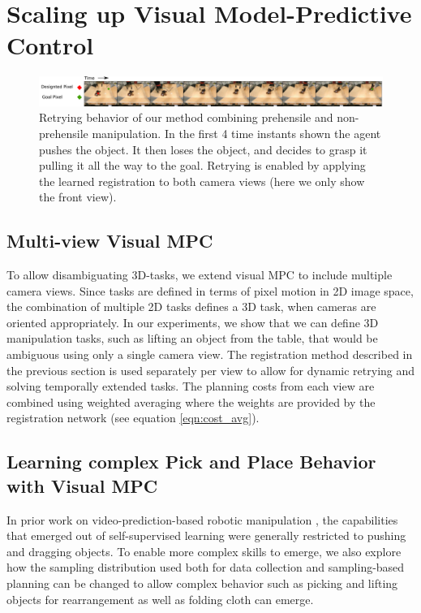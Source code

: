 \section{Scaling up Visual Model-Predictive Control}
\begin{figure}
	\centering
	\includegraphics[width=1.0\textwidth]{images_rfr/pick_place_plush.pdf}
	\caption{\small{Retrying behavior of our method combining prehensile and non-prehensile manipulation. In the first 4 time instants shown the agent pushes the object. It then loses the object, and decides to grasp it pulling it all the way to the goal. Retrying is enabled by applying the learned registration to both camera views (here we only show the front view).}}
	\label{fig:push_grasp}
	
\end{figure}

\label{sec:scalingup}
\subsection{Multi-view Visual MPC}
To allow disambiguating 3D-tasks, we extend visual MPC to include multiple camera views. Since tasks are defined in terms of pixel motion in 2D image space, the combination of multiple 2D tasks defines a 3D task, when cameras are oriented appropriately. In our experiments, we show that we can define 3D manipulation tasks, such as lifting an object from the table, that would be ambiguous using only a single camera view. The registration method described in the previous section is used separately per view to allow for dynamic retrying and solving temporally extended tasks. The planning costs from each view are combined using weighted averaging where the weights are provided by the registration network (see equation \ref{eqn:cost_avg}). 

\subsection{Learning complex Pick and Place Behavior with Visual MPC}
In prior work on video-prediction-based robotic manipulation \cite{sna, foresight}, the capabilities that emerged out of self-supervised learning were generally restricted to pushing and dragging objects. To enable more complex skills to emerge, we also explore how the sampling distribution used both for data collection and sampling-based planning can be changed to allow complex behavior such as picking and lifting objects for rearrangement as well as folding cloth can emerge. 

